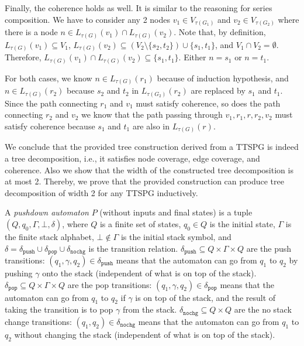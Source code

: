 \documentclass[10pt]{homework}
\begin{document}
\begin{induction}
Finally, the coherence holds as well.
It is similar to the reasoning for series composition.
We have to consider any 2 nodes \(v_1 \in V_{\tau(G_1)}\) and \(v_2 \in V_{\tau(G_2)}\)
where there is a node \(n \in L_{\tau(G)}(v_1)\cap L_{\tau(G)}(v_2)\).
Note that, by definition, \(L_{\tau(G)}(v_1) \subseteq V_1\), 
\(L_{\tau(G)}(v_2) \subseteq (V_2 \setminus \{s_2, t_2\})\cup\{s_1, t_1\}\),
and \(V_1 \cap V_2 = \emptyset\).
Therefore, \(L_{\tau(G)}(v_1)\cap L_{\tau(G)}(v_2) \subseteq \{s_1, t_1\}\).
Either \(n = s_1\) or \(n = t_1\).

For both cases, we know \(n \in L_{\tau(G)}(r_1)\) because of induction hypothesis,
and \(n \in L_{\tau(G)}(r_2)\) because \(s_2\) and \(t_2\) in \(L_{\tau(G_2)}(r_2)\)
are replaced by \(s_1\) and \(t_1\).
Since the path connecting \(r_1\) and \(v_1\) must satisfy coherence,
so does the path connecting \(r_2\) and \(v_2\)
we know that the path passing through \(v_1, r_1, r, r_2, v_2\) must satisfy coherence
because \(s_1\) and \(t_1\) are also in \(L_{\tau(G)}(r)\).

\end{induction}
We conclude that the provided tree construction derived from a TTSPG is indeed
a tree decomposition,
i.e., it satisfies node coverage, edge coverage, and coherence.
Also we show that the width of the constructed tree decomposition is at most 2.
Thereby, we prove that the provided construction can produce tree decomposition
of width 2 for any TTSPG inductively.

\question

A \emph{pushdown automaton} \(P\) (without inputs and final states) is a tuple
\((Q, q_0, \Gamma, \bot, \delta)\), where \(Q\) is a finite set of states,
\(q_0 \in Q\) is the initial state, \(\Gamma\) is the finite stack alphabet,
\(\bot \notin \Gamma\)  is the initial stack symbol,
and \(\delta = \delta_\mathtt{push} \cup \delta_\mathtt{pop} \cup \delta_\mathtt{nochg}\) is the transition relation.
\(\delta_\mathtt{push} \subseteq Q \times \Gamma \times Q\) are the push 
transitions: \((q_1, \gamma, q_2) \in \delta_\mathtt{push}\) means that the automaton can go from \(q_1\) to \(q_2\) by pushing \(\gamma\) onto the stack 
(independent of what is on top of the stack).
\(\delta_\mathtt{pop} \subseteq Q \times \Gamma \times Q\) are the pop transitions:
\((q_1, \gamma, q_2) \in \delta_\mathtt{pop}\) means that the automaton can go from \(q_1\) to \(q_2\) if \(\gamma\) is on top of the stack, and the result of taking the transition is to pop \(\gamma\) from the stack.
\(\delta_\mathtt{nochg} \subseteq Q \times Q\) are the no stack change transitions:
\((q_1, q_2) \in \delta_\mathtt{nochg}\) means that the automaton can go from \(q_1\) to \(q_2\) without changing the stack (independent of what is on top of the stack).
\end{document}
